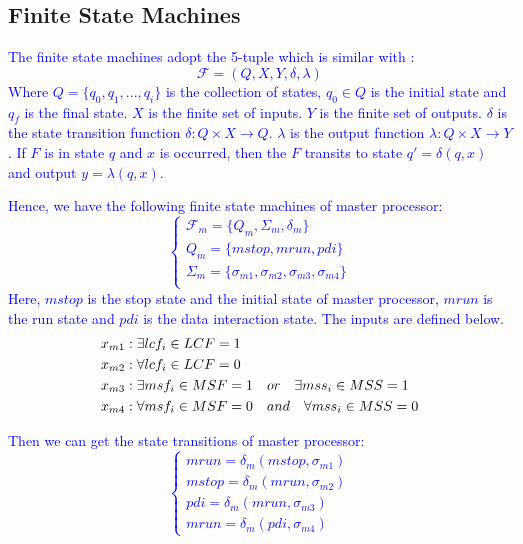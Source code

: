 \documentclass[journal,UTF8]{IEEEtran}
\begin{document}
 \subsection{Finite State Machines}
 \textcolor{blue}{ The finite state machines adopt the 5-tuple which is similar with \cite{Hierons2016Parallel}:
 \begin{equation}
 \mathcal{F} = (Q, X, Y, \delta, \lambda)
 \end{equation}
 Where $Q = \{q_0, q_1,..., q_i\}$ is the collection of states, $q_0 \in Q$ is the initial state and $q_f$ is the final state. $X$ is the finite set of inputs. $Y$ is the finite set of outputs. $\delta$ is the state transition function $\delta: Q\times X \rightarrow Q$. $\lambda$ is the output function $\lambda: Q\times X\rightarrow Y$. If $F$ is in state $q$ and $x$ is occurred, then the $F$ transits to state $q' = \delta(q, x)$ and output $y = \lambda(q, x)$.}
 
 \textcolor{blue}{Hence, we have the following finite state machines of master processor:
  \begin{equation}
 \left\{
 \begin{array}{l}
 \mathcal{F}_{m} = \{Q_m, \Sigma_m, \delta_m\}\\
 Q_m = \{mstop, mrun, pdi\}\\
 \Sigma_m = \{\sigma_{m1}, \sigma_{m2}, \sigma_{m3}, \sigma_{m4}\}\\
 \end{array}
 \right.
 \end{equation}
 Here, $mstop$ is the stop state and the initial state of master processor, $mrun$ is the run state and $pdi$ is the data interaction state. The inputs are defined below.
 \begin{align}
 \notag x_{m1}&: \exists lcf_i \in LCF = 1\\
\notag x_{m2}&: \forall lcf_i \in LCF = 0\\
\notag x_{m3}&: \exists msf_i \in MSF = 1\quad or \quad \exists mss_i \in MSS = 1\\
\notag x_{m4}&: \forall msf_i \in MSF = 0\quad and \quad \forall mss_i \in MSS = 0
 \end{align}}

\textcolor{blue}{Then we can get the state transitions of master processor:
  \begin{equation}
 \left\{
 \begin{array}{l}
 mrun = \delta_m (mstop, \sigma_{m1})\\
mstop = \delta_m (mrun, \sigma_{m2})\\
pdi = \delta_m (mrun, \sigma_{m3})\\
mrun = \delta_m (pdi, \sigma_{m4})
 \end{array}
 \right.
 \end{equation}}
 
\end{document}
